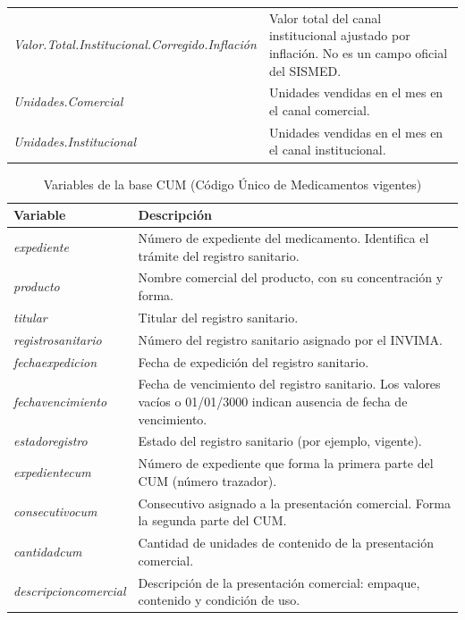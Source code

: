 \documentclass[10pt,twoside,xcolor=table,x11anmes]{IEEEtran}
\begin{document}
\begin{table}[!t]
\begin{tabular}{>{\raggedright\arraybackslash}p{} >{\raggedright\arraybackslash}p{}}
\textit{Valor.\allowbreak Total.\allowbreak Institucional.\allowbreak Corregido.\allowbreak Inflación} & Valor total del canal institucional ajustado por inflación. No es un campo oficial del SISMED. \\
\textit{Unidades.\allowbreak Comercial} & Unidades vendidas en el mes en el canal comercial. \\
\textit{Unidades.\allowbreak Institucional} & Unidades vendidas en el mes en el canal institucional. \\
\bottomrule
\end{tabular}
\end{table}

\begin{table}[!t]
\caption{Variables de la base CUM (Código Único de Medicamentos vigentes)}\label{tab:cum}
\centering
\footnotesize
\renewcommand{\arraystretch}{1.15}
\begin{tabular}{>{\raggedright\arraybackslash}p{} >{\raggedright\arraybackslash}p{}}
\toprule
\textbf{Variable} & \textbf{Descripción} \\
\midrule
\textit{expediente} & Número de expediente del medicamento. Identifica el trámite del registro sanitario. \\
\textit{producto} & Nombre comercial del producto, con su concentración y forma. \\
\textit{titular} & Titular del registro sanitario. \\
\textit{registrosanitario} & Número del registro sanitario asignado por el INVIMA. \\
\textit{fechaexpedicion} & Fecha de expedición del registro sanitario. \\
\textit{fechavencimiento} & Fecha de vencimiento del registro sanitario. Los valores vacíos o 01/01/3000 indican ausencia de fecha de vencimiento. \\
\textit{estadoregistro} & Estado del registro sanitario (por ejemplo, vigente). \\
\textit{expedientecum} & Número de expediente que forma la primera parte del CUM (número trazador). \\
\textit{consecutivocum} & Consecutivo asignado a la presentación comercial. Forma la segunda parte del CUM. \\
\textit{cantidadcum} & Cantidad de unidades de contenido de la presentación comercial. \\
\textit{descripcioncomercial} & Descripción de la presentación comercial: empaque, contenido y condición de uso. \\

\end{tabular}
\end{table}
\end{document}
